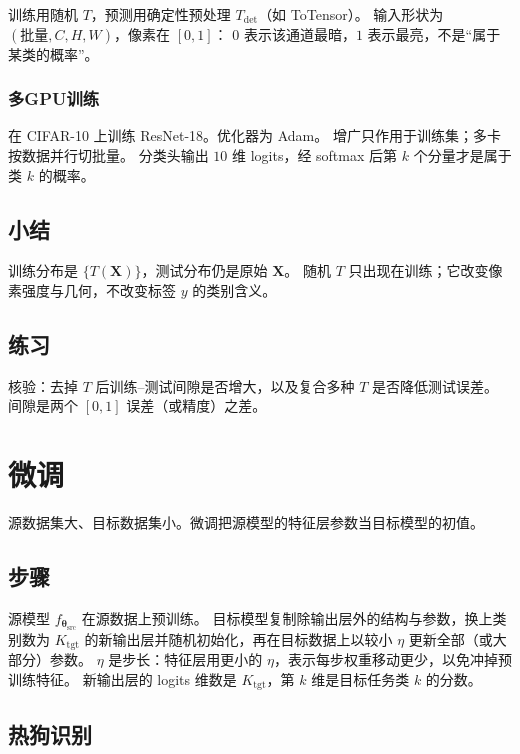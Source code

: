 训练用随机 $T$，预测用确定性预处理 $T_{\mathrm{det}}$（如 ToTensor）。
输入形状为 $(\text{批量},C,H,W)$，像素在 $[0,1]$：
$0$ 表示该通道最暗，$1$ 表示最亮，不是“属于某类的概率”。

\subsubsection{多GPU训练}

在 CIFAR-10 上训练 ResNet-18。优化器为 Adam。
增广只作用于训练集；多卡按数据并行切批量。
分类头输出 $10$ 维 logits，经 softmax 后第 $k$ 个分量才是属于类 $k$ 的概率。

\subsection{小结}

训练分布是 $\{T(\bm{X})\}$，测试分布仍是原始 $\bm{X}$。
随机 $T$ 只出现在训练；它改变像素强度与几何，不改变标签 $y$ 的类别含义。

\subsection{练习}

核验：去掉 $T$ 后训练–测试间隙是否增大，以及复合多种 $T$ 是否降低测试误差。
间隙是两个 $[0,1]$ 误差（或精度）之差。

\section{微调}



源数据集大、目标数据集小。微调把源模型的特征层参数当目标模型的初值。

\subsection{步骤}

源模型 $f_{\bm{\theta}_{\mathrm{src}}}$ 在源数据上预训练。
目标模型复制除输出层外的结构与参数，换上类别数为 $K_{\mathrm{tgt}}$ 的新输出层并随机初始化，再在目标数据上以较小 $\eta$ 更新全部（或大部分）参数。
$\eta$ 是步长：特征层用更小的 $\eta$，表示每步权重移动更少，以免冲掉预训练特征。
新输出层的 logits 维数是 $K_{\mathrm{tgt}}$，第 $k$ 维是目标任务类 $k$ 的分数。

\subsection{热狗识别}

